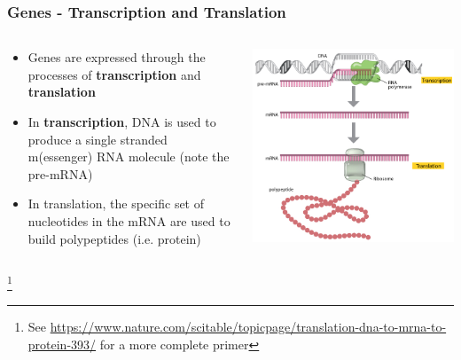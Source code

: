 \documentclass{beamer}
\newcommand\blfootnote[1]{%
	\begingroup
	\renewcommand\thefootnote{}\footnote{#1}%
	\addtocounter{footnote}{-1}%
	\endgroup
}
\begin{document}
\begin{frame}
	\frametitle{Genes - Transcription and Translation}
	
	
	
	\begin{columns}
		\begin{column}{0.5\textwidth}
			\begin{itemize}
				\scriptsize
				\item Genes are expressed through the processes of \textbf{transcription} and \textbf{translation}
				\vspace{5pt}
				\item In \textbf{transcription}, DNA is used to produce a single stranded m(essenger) RNA molecule (note the pre-mRNA)
				\vspace{5pt}
				\item In translation, the specific set of nucleotides in the mRNA are used to build polypeptides (i.e. protein) 
			\end{itemize}
			
		\end{column}
		\begin{column}{0.5\textwidth}
			\centering	\includegraphics[keepaspectratio, width  = \textwidth]{img/dna2rna2protein}\\
		\end{column}
	\end{columns}
	
	\blfootnote{See \url{https://www.nature.com/scitable/topicpage/translation-dna-to-mrna-to-protein-393/} for a more complete primer}
\end{frame}
\end{document}
